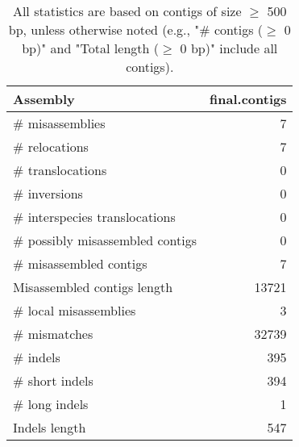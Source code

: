 \documentclass[12pt,a4paper]{article}
\begin{document}
\begin{table}[ht]
\begin{center}
\caption{All statistics are based on contigs of size $\geq$ 500 bp, unless otherwise noted (e.g., "\# contigs ($\geq$ 0 bp)" and "Total length ($\geq$ 0 bp)" include all contigs).}
\begin{tabular}{|l*{1}{|r}|}
\hline
Assembly & final.contigs \\ \hline
\# misassemblies & 7 \\ \hline
\hspace{5mm}\# relocations & 7 \\ \hline
\hspace{5mm}\# translocations & 0 \\ \hline
\hspace{5mm}\# inversions & 0 \\ \hline
\hspace{5mm}\# interspecies translocations & 0 \\ \hline
\# possibly misassembled contigs & 0 \\ \hline
\# misassembled contigs & 7 \\ \hline
Misassembled contigs length & 13721 \\ \hline
\# local misassemblies & 3 \\ \hline
\# mismatches & 32739 \\ \hline
\# indels & 395 \\ \hline
\hspace{5mm}\# short indels & 394 \\ \hline
\hspace{5mm}\# long indels & 1 \\ \hline
Indels length & 547 \\ \hline
\end{tabular}
\end{center}
\end{table}
\end{document}
